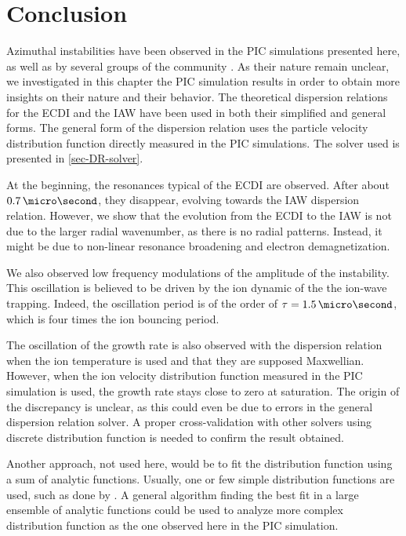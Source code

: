 
\section{Conclusion}
  Azimuthal instabilities have been observed in the \ac{PIC} simulations presented here, as well as by several groups of the community \citep{hara2019a,janhunen2018,taccogna2019}.
  As their nature remain unclear, we investigated in this chapter the \ac{PIC} simulation results in order to obtain more insights on their nature and their behavior.
  The theoretical dispersion relations for the \ac{ECDI} and the \ac{IAW} have been used in both their simplified and general forms.
  The general form of the dispersion relation uses the particle velocity distribution function directly measured in the \ac{PIC} simulations.
  The solver used is presented in \cref{sec-DR-solver}.
  
  At the beginning, the resonances typical of the \ac{ECDI} are observed.
  After about $0.7\,\micro\second$, they disappear, evolving towards the \ac{IAW} dispersion relation.
  However, we show that the evolution from the \ac{ECDI} to the \ac{IAW}  is not due to the larger radial wavenumber, as there is no radial patterns.
  Instead, it might be due to non-linear resonance broadening and electron demagnetization.
  
  \vspace{1ex}
  We also observed low frequency modulations of the amplitude of the instability.
  This oscillation is believed to be driven by the ion dynamic of the the ion-wave trapping.
  Indeed, the oscillation period is of the order of $\tau=1.5\,\micro\second$, which is four times the ion bouncing period.
    
  
  The oscillation of the growth rate is also observed with the dispersion relation when the ion temperature is used and that they are supposed Maxwellian.
  However, when the ion velocity distribution function measured in the \ac{PIC}  simulation is used, the growth rate stays close to zero at saturation.
  The origin of the discrepancy is unclear, as this could even be due to errors in the general dispersion relation solver.
  A proper cross-validation with other solvers using discrete distribution function is needed to confirm the result obtained.
  
  Another approach, not used here, would be to fit the distribution function using a sum of analytic functions.
  Usually, one or few simple distribution functions are used, such as done by \citet{ronnmark1982}.
  A general algorithm finding the best fit in a large ensemble of analytic functions could be used to analyze more complex distribution function as the one observed here in the PIC simulation.

